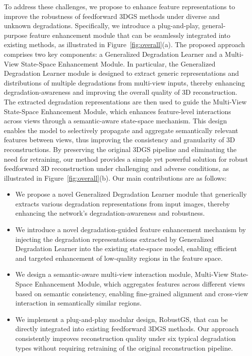 \documentclass[letterpaper]{article} %
\newcommand{\NAMEfem}{Multi-View State-Space Enhancement Module\xspace}
\newcommand{\NAMEdeg}{Generalized Degradation Learner\xspace}
\newcommand{\NAMEall}{RobustGS\xspace}
\begin{document}
To address these challenges, we propose to enhance feature representations to improve the robustness of feedforward 3DGS methods under diverse and unknown degradations. Specifically, we introduce a plug-and-play, general-purpose feature enhancement module that can be seamlessly integrated into existing methods, as illustrated in Figure~\ref{fig:overall}(a). The proposed approach comprises two key components: a \NAMEdeg and a \NAMEfem. In particular, the \NAMEdeg module is designed to extract generic representations and distributions of multiple degradations from multi-view inputs, thereby enhancing degradation-awareness and improving the overall quality of 3D reconstruction. The extracted degradation representations are then used to guide the \NAMEfem, which enhances feature-level interactions across views through a semantic-aware state-space mechanism. This design enables the model to selectively propagate and aggregate semantically relevant features between views, thus improving the consistency and granularity of 3D reconstructions. By preserving the original 3DGS pipeline and eliminating the need for retraining, our method provides a simple yet powerful solution for robust feedforward 3D reconstruction under challenging and adverse conditions, as illustrated in Figure~\ref{fig:overall}(b). Our main contributions are as follows:


\begin{itemize}
    \item We propose a novel \NAMEdeg module that generically extracts various degradation representations from input images, thereby enhancing the network's degradation-awareness and robustness.

    \item We introduce a novel degradation-guided feature enhancement mechanism by injecting the degradation representations extracted by \NAMEdeg into the existing state-space model, enabling efficient and targeted enhancement of low-quality regions in the feature space.
    
    \item We design a semantic-aware multi-view interaction module, \NAMEfem, which aggregates features across different views based on semantic consistency, enabling fine-grained alignment and cross-view interaction in semantically similar regions.
    
    \item We implement a plug-and-play modular design, \NAMEall, that can be directly integrated into existing feedforward 3DGS methods. Our approach consistently improves reconstruction quality under six typical degradation types without requiring retraining of the original reconstruction pipeline.
\end{itemize}
\end{document}
